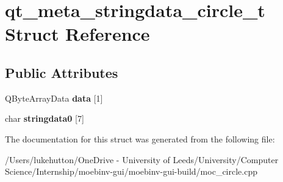 \hypertarget{structqt__meta__stringdata__circle__t}{}\section{qt\+\_\+meta\+\_\+stringdata\+\_\+circle\+\_\+t Struct Reference}
\label{structqt__meta__stringdata__circle__t}
\subsection*{Public Attributes}
\begin{DoxyCompactItemize}
\item 
\mbox{\label{structqt__meta__stringdata__circle__t_a7930d41cb3c0ef3a8124a1d41c10946f}} 
Q\+Byte\+Array\+Data {\bfseries data} \mbox{[}1\mbox{]}
\item 
\mbox{\label{structqt__meta__stringdata__circle__t_ad3010a59b3cd22c250828be7413a7157}} 
char {\bfseries stringdata0} \mbox{[}7\mbox{]}
\end{DoxyCompactItemize}


The documentation for this struct was generated from the following file\+:\begin{DoxyCompactItemize}
\item 
/\+Users/lukehutton/\+One\+Drive -\/ University of Leeds/\+University/\+Computer Science/\+Internship/moebinv-\/gui/moebinv-\/gui-\/build/moc\+\_\+circle.\+cpp\end{DoxyCompactItemize}
